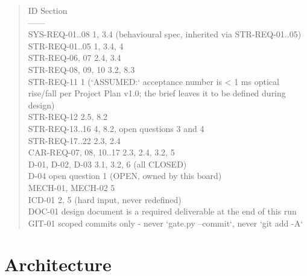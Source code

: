 \documentclass[11pt,a4paper]{article}
\begin{document}
\begin{quote}\small\ttfamily\raggedright
\textbar{} ID \textbar{} Section \textbar{}\\
\textbar{}---\textbar{}---\textbar{}\\
\textbar{} SYS-REQ-01..08 \textbar{} 1, 3.4 (behavioural spec, inherited via STR-REQ-01..05) \textbar{}\\
\textbar{} STR-REQ-01..05 \textbar{} 1, 3.4, 4 \textbar{}\\
\textbar{} STR-REQ-06, 07 \textbar{} 2.4, 3.4 \textbar{}\\
\textbar{} STR-REQ-08, 09, 10 \textbar{} 3.2, 8.3 \textbar{}\\
\textbar{} STR-REQ-11 \textbar{} 1 (`ASSUMED:` acceptance number is \textless{} 1 ms optical rise/fall per Project Plan v1.0; the brief leaves it to be defined during design) \textbar{}\\
\textbar{} STR-REQ-12 \textbar{} 2.5, 8.2 \textbar{}\\
\textbar{} STR-REQ-13..16 \textbar{} 4, 8.2, open questions 3 and 4 \textbar{}\\
\textbar{} STR-REQ-17..22 \textbar{} 2.3, 2.4 \textbar{}\\
\textbar{} CAR-REQ-07, 08, 10..17 \textbar{} 2.3, 2.4, 3.2, 5 \textbar{}\\
\textbar{} D-01, D-02, D-03 \textbar{} 3.1, 3.2, 6 (all CLOSED) \textbar{}\\
\textbar{} D-04 \textbar{} open question 1 (OPEN, owned by this board) \textbar{}\\
\textbar{} MECH-01, MECH-02 \textbar{} 5 \textbar{}\\
\textbar{} ICD-01 \textbar{} 2, 5 (hard input, never redefined) \textbar{}\\
\textbar{} DOC-01 \textbar{} design document is a required deliverable at the end of this run \textbar{}\\
\textbar{} GIT-01 \textbar{} scoped commits only - never `gate.py --commit`, never `git add -A` \textbar{}
\end{quote}
\section{Architecture}
\end{document}
